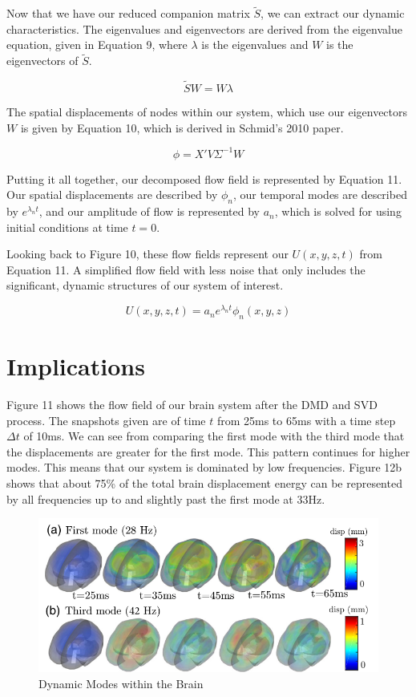 \documentclass[%
 aip,
 amsmath,amssymb,
 reprint,%
 floatfix,%
]{revtex4-1}
\begin{document}
Now that we have our reduced companion matrix $\tilde S$, we can extract our dynamic characteristics. The eigenvalues and eigenvectors are derived from the eigenvalue equation, given in Equation 9, where $\lambda$ is the eigenvalues and $W$ is the eigenvectors of $\tilde S$.

\begin{equation}
	\tilde S W = W \lambda
\end{equation}

The spatial displacements of nodes within our system, which use our eigenvectors $W$ is given by Equation 10, which is derived in Schmid's 2010 paper.

\begin{equation}
	\phi = X' V \Sigma^{-1} W
\end{equation}

Putting it all together, our decomposed flow field is represented by Equation 11. Our spatial displacements are described by $\phi_n$, our temporal modes are described by $e^{\lambda_n t}$, and our amplitude of flow is represented by $a_n$, which is solved for using initial conditions at time $t=0$.

Looking back to Figure 10, these flow fields represent our $U(x,y,z,t)$ from Equation 11. A simplified flow field with less noise that only includes the significant, dynamic structures of our system of interest. 

\begin{equation}
	U(x,y,z,t) = a_n e^{\lambda_n t} \phi_n(x,y,z)
\end{equation}

\section{\label{sec:level5}Implications}

Figure 11 shows the flow field of our brain system after the DMD and SVD process. The snapshots given are of time $t$ from 25ms to 65ms with a time step $\Delta t$ of 10ms. We can see from comparing the first mode with the third mode that the displacements are greater for the first mode. This pattern continues for higher modes. This means that our system is dominated by low frequencies. Figure 12b shows that about 75\% of the total brain displacement energy can be represented by all frequencies up to and slightly past the first mode at 33Hz. 

\begin{figure}
	\centering
	\includegraphics[scale=0.3]{modes.png}
	\caption{Dynamic Modes within the Brain}
\end{figure}
\end{document}
